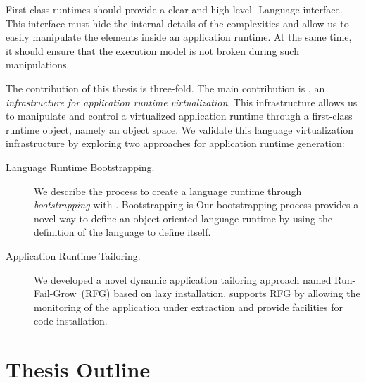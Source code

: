 First-class runtimes should provide a clear and high-level \VM-Language interface. This interface must hide the internal details of the \VM complexities and allow us to easily manipulate the elements inside an application runtime. At the same time, it should ensure that the \VM execution model is not broken during such manipulations.

The contribution of this thesis is three-fold. The main contribution is \Vtt, an \emph{infrastructure for application runtime virtualization}. This infrastructure allows us to manipulate and control a virtualized application runtime through a first-class runtime object, namely an object space.
We validate this language virtualization infrastructure by exploring two approaches for application runtime generation:
\begin{description}
\item[Language Runtime Bootstrapping.] We describe the process to create a language runtime through \emph{bootstrapping} with \Vtt. Bootstrapping is Our bootstrapping process provides a novel way to define an object-oriented language runtime by using the definition of the language to define itself.
\item[Application Runtime Tailoring.] We developed a novel dynamic application tailoring approach named Run-Fail-Grow~(RFG) based on lazy installation. \Vtt supports RFG by allowing the monitoring of the application under extraction and provide facilities for code installation.
\end{description}

\section{Thesis Outline}

\begin{description}
\item[] 

\item[] 
	
\item[] 

\item[] 

\item[] 

\end{description}



